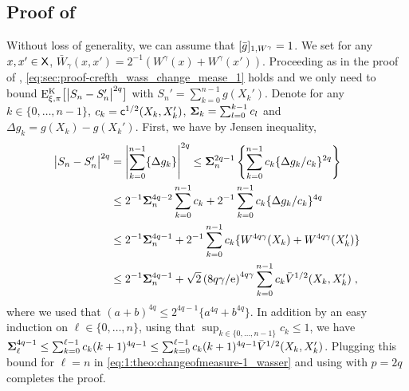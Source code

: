 \subsection{Proof of }
\label{sec:proof-crefth-1_wass:theo:changeofmeasure-1_wasser}
Without loss of generality, we can assume that $\Nnorm[1, W^{\gamma}]{\bar{g}} = 1$. We set for any $x,x'\in\Xset$, $\bar{W}_{\gamma}(x,x') = 2^{-1}(W^{\gamma}(x)+ W^{\gamma}(x'))$.  Proceeding as in the proof of , \eqref{eq:sec:proof-crefth_wass_change_mease_1} holds and  we only need to bound $ \PE_{\xi,\pi}^{\MKK}\big[ \big|S_n-S_n' \big|^{2q} \big]$ with $S_n' = \sum_{k=0}^{n-1} g(X_k')$. Denote for any $k \in\{0,\ldots,n-1\}$, $c_k = \cost^{1/2}(X_k,X_k')$, $\Sigmabf_k = \sum_{l=0}^{k-1} c_l$ and $\Delta g_k = g(X_k)-g(X_k')$. First, we have
by Jensen inequality,
  \begin{align}
    \nonumber
    \big|S_n-S_n' \big|^{2q} &= \abs{\sum_{k=0}^{n-1} \{\Delta g_k\}}^{2q} \leq \Sigmabf_{n}^{2q-1} \defEns{\sum_{k=0}^{n-1} c_k \{\Delta g_k / c_k\}^{2q} }  \\
    \nonumber                             &\leq 2^{-1} \Sigmabf_{n}^{4q-2} \sum_{k=0}^{n-1} c_k  +  2^{-1} \sum_{k=0}^{n-1} c_k \{\Delta g_k / c_k\}^{4q}\\
                              \nonumber   & \leq 2^{-1} \Sigmabf_{n}^{4q-1}  +  2^{-1}\sum_{k=0}^{n-1} c_k\{ W^{4q \gamma}(X_k) + W^{4q\gamma}(X_k') \}\\
\label{eq:1:theo:changeofmeasure-1_wasser}                         & \leq 2^{-1} \Sigmabf_{n}^{4q-1}  +  \sqrt{2} \parenthese{8q \gamma/\rme}^{4q \gamma} \sum_{k=0}^{n-1} c_k\bar{V}^{1/2}(X_k,X_k') \eqsp,
  \end{align}
  where we used that  $(a+b)^{4q} \leq 2^{4q-1}\{a^{4q}+ b^{4q}\}$.
In addition by an easy induction on $\ell \in \{0,\ldots,n\}$, using that $\sup_{k \in \{0,\ldots,n-1\}} c_k \leq 1$, we have $ \Sigmabf_{\ell}^{4q-1} \leq \sum_{k=0}^{\ell-1} c_k (k+1)^{4q-1} \leq \sum_{k=0}^{\ell-1} c_k (k+1)^{4q-1} \bar{V}^{1/2}(X_k,X_k')$. Plugging this bound for $\ell=n$ in \eqref{eq:1:theo:changeofmeasure-1_wasser} and using  with $p=2q$ completes the proof.



